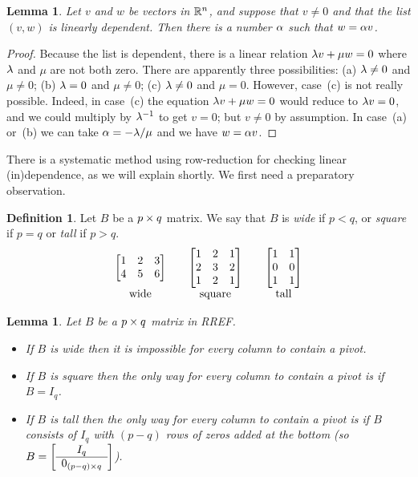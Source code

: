 \documentclass[reqno]{amsart}
\newtheorem{lemma}[theorem]{Lemma}
\theoremstyle{definition}
\newtheorem{definition}[theorem]{Definition}
\newcommand{\dfn}[1]{\emph{{#1}}\index{#1}}
\begin{document}
\begin{lemma}\label{lem-multiples}
 Let $v$ and $w$ be vectors in ${\mathbb{R}}^n$, and suppose that $v\neq 0$ and
 that the list $(v,w)$ is linearly dependent.  Then there is a number
 $\alpha$ such that $w=\alpha v$.
\end{lemma}
\begin{proof}
 Because the list is dependent, there is a linear relation
 $\lambda v+\mu w=0$ where $\lambda$ and $\mu$ are not both zero.  There are
 apparently three possibilities: (a) $\lambda\neq 0$ and $\mu\neq 0$; (b)
 $\lambda=0$ and $\mu\neq 0$; (c) $\lambda\neq 0$ and $\mu=0$.  However,
 case~(c) is not really possible.  Indeed, in case~(c) the equation
 $\lambda v+\mu w=0$ would reduce to $\lambda v=0$, and we could multiply by
 $\lambda^{-1}$ to get $v=0$; but $v\neq 0$ by assumption.  In case~(a)
 or~(b) we can take $\alpha=-\lambda/\mu$ and we have $w=\alpha v$.
\end{proof}

There is a systematic method using row-reduction for checking linear
(in)dependence, as we will explain shortly.  We first need a
preparatory observation.

\begin{definition}\label{defn-wide}
 Let $B$ be a $p\times q$ matrix.  We say that $B$ is \dfn{wide} if
 $p<q$, or \dfn{square} if $p=q$ or \dfn{tall} if $p>q$.
 \[ \begin{array}{ccccc}
     \left[\begin{matrix} 1 & 2 & 3 \\ 4 & 5 & 6 \end{matrix}\right] & &
     \left[\begin{matrix} 1 & 2 & 1 \\ 2 & 3 & 2 \\ 1 & 2 & 1 \end{matrix}\right] & &
     \left[\begin{matrix} 1 & 1 \\ 0 & 0 \\ 1 & 1 \end{matrix}\right] \\
     \text{ wide } & & \text{ square } & & \text{ tall }
    \end{array}
 \]
\end{definition}
\begin{lemma}\label{lem-pivots-everywhere}
 Let $B$ be a $p\times q$ matrix in RREF.
 \begin{itemize}
  \item[(a)] If $B$ is wide then it is impossible for every column to
   contain a pivot.
  \item[(b)] If $B$ is square then the only way for every column to
   contain a pivot is if $B=I_q$.
  \item[(c)] If $B$ is tall  then the only way for every column to
   contain a pivot is if $B$ consists of $I_q$ with $(p-q)$ rows of
   zeros added at the bottom (so
   $B=\left[\begin{array}{c} I_q \\ \hline 0_{(p-q)\times q}
      \end{array}\right]$).
 \end{itemize}
\end{lemma}
\end{document}
